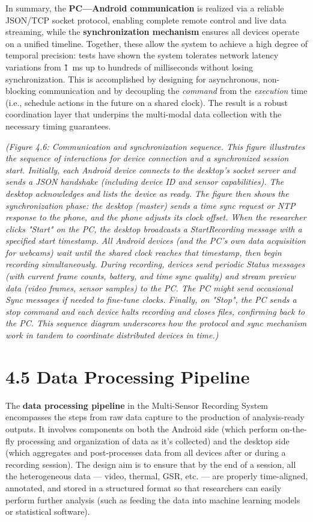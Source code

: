 \documentclass[11pt,a4paper]{report}
\begin{document}
In summary, the \textbf{PC---Android communication} is realized via a reliable
JSON/TCP socket protocol, enabling complete remote control and live
data streaming, while the \textbf{synchronization mechanism} ensures all
devices operate on a unified timeline. Together, these allow the system
to achieve a high degree of temporal precision: tests have shown the
system tolerates network latency variations from \~1 ms up to hundreds
of milliseconds without losing
synchronization.
This is accomplished by designing for asynchronous, non-blocking
communication and by decoupling the \textit{command} from the \textit{execution} time
(i.e., schedule actions in the future on a shared clock). The result is
a robust coordination layer that underpins the multi-modal data
collection with the necessary timing guarantees.

\textit{(Figure 4.6: Communication and synchronization sequence. This figure
illustrates the sequence of interactions for device connection and a
synchronized session start. Initially, each Android device connects to
the desktop's socket server and sends a JSON handshake (including device
ID and sensor capabilities). The desktop acknowledges and lists the
device as ready. The figure then shows the} \textit{synchronization phase: the
desktop (master) sends a time sync request or NTP response to the phone,
and the phone adjusts its clock offset. When the researcher clicks
"Start" on the PC, the desktop broadcasts a} \textit{StartRecording} \textit{message
with a specified start timestamp. All Android devices (and the PC's own
data acquisition for webcams) wait until the shared clock reaches that
timestamp, then begin recording simultaneously. During recording,
devices send periodic} \textit{Status} \textit{messages (with current frame counts,
battery, and time sync quality) and stream preview data (video frames,
sensor samples) to the PC. The PC might send occasional} \textit{Sync}
\textit{messages if needed to fine-tune clocks. Finally, on "Stop", the PC
sends a stop command and each device halts recording and closes files,
confirming back to the PC. This sequence diagram underscores how the
protocol and sync mechanism work in tandem to coordinate distributed
devices in time.)}

\section{4.5 Data Processing Pipeline}

The \textbf{data processing pipeline} in the Multi-Sensor Recording System
encompasses the steps from raw data capture to the production of
analysis-ready outputs. It involves components on both the Android side
(which perform on-the-fly processing and organization of data as it's
collected) and the desktop side (which aggregates and post-processes
data from all devices after or during a recording session). The design
aim is to ensure that by the end of a session, all the heterogeneous
data --- video, thermal, GSR, etc. --- are properly time-aligned,
annotated, and stored in a structured format so that researchers can
easily perform further analysis (such as feeding the data into machine
learning models or statistical software).
\end{document}
